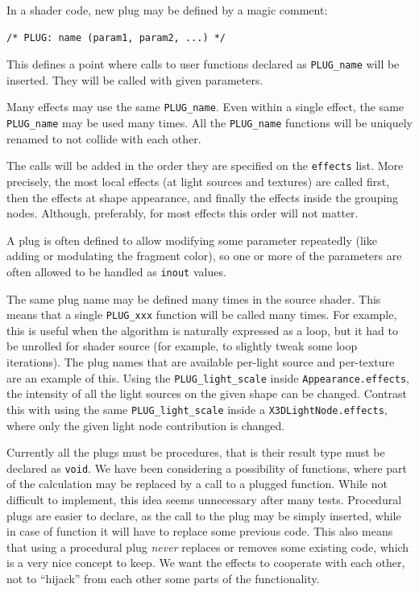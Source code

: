 \documentclass{egpubl}
\newenvironment{mycode}
{\begin{mycodecore}}
{\end{mycodecore}
\vspace{-0.1in}}
\begin{document}
In a shader code, new plug may be defined by a magic comment:

\begin{mycode}
\begin{Verbatim}[commandchars=\\\{\},fontsize=\small]
/* PLUG: name (param1, param2, ...) */
\end{Verbatim}
\end{mycode}

This defines a point where calls to user functions declared as
\texttt{PLUG\_name} will be inserted. They will be called with given
parameters.

Many effects may use the same \texttt{PLUG\_name}.
Even within a single effect, the same \texttt{PLUG\_name} may be used
many times. All the \texttt{PLUG\_name} functions
will be uniquely renamed to not collide with each other.

The calls will be added in the order they are specified on the
\texttt{effects} list. More precisely, the most local effects
(at light sources and textures) are called first, then the effects
at shape appearance, and finally the effects inside the grouping nodes.
Although, preferably, for most effects this order will not matter.

A plug is often defined to allow modifying some parameter
repeatedly (like adding or modulating the fragment color),
so one or more of the parameters are often allowed to be handled
as \texttt{inout} values.

The same plug name may be defined many times in the source shader.
This means that a single \texttt{PLUG\_xxx} function will be called
many times. For example, this is useful when the algorithm is naturally
expressed as a loop, but it had to be unrolled for shader source
(for example, to slightly tweak some loop iterations).
The plug names that are available per-light source and per-texture
are an example of this.
Using the \texttt{PLUG\_light\_scale}
inside \texttt{Appearance.effects}, the intensity
of all the light sources on the given shape can be changed. Contrast this with using
the same \texttt{PLUG\_light\_scale} inside a \texttt{X3DLightNode.effects},
where only the given light node contribution is changed.

Currently all the plugs must be procedures, that is their result type
must be declared as \texttt{void}. We have been considering
a possibility of functions, where part of the calculation may be replaced
by a call to a plugged function. While not difficult to implement,
this idea seems unnecessary after many tests.
Procedural plugs are easier to declare, as the call to the plug
may be simply inserted, while in case of function it will have to replace
some previous code. This also means that using a procedural plug
\textit{never} replaces or removes some existing code, which is a very nice
concept to keep. We want the effects to cooperate with each other,
not to ``hijack'' from each other some parts of the functionality.
\end{document}
